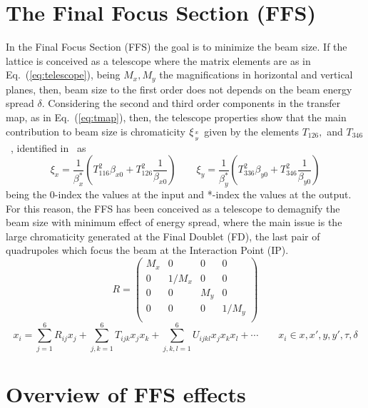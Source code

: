 \section{The Final Focus Section (FFS)}
In the Final Focus Section (FFS) the goal is to minimize the beam size. If the lattice is conceived as a telescope where the matrix elements are as in Eq.~(\ref{eq:telescope}), being $M_x, M_y$ the magnifications in horizontal and vertical planes, then, beam size to the first order does not depends on the beam energy spread $\delta$. Considering the second and third order components in the transfer map, as in Eq.~(\ref{eq:tmap}), then, the telescope properties show that the main contribution to beam size is chromaticity $\xi_{\genfrac{}{}{0pt}{}{x}{y}}$ given by the elements $T_{126},$ and $T_{346}$~\cite{Brown:1987}, identified in~\cite{GarciaMorales:1982827} as
\begin{equation}
 \xi_x = \frac{1}{\beta_x^*}\left(T_{116}^2\beta_{x0}+T_{126}^2\frac{1}{\beta_{x0}}\right)\qquad
 \xi_y = \frac{1}{\beta_y^*}\left(T_{336}^2\beta_{y0}+T_{346}^2\frac{1}{\beta_{y0}}\right)
\end{equation}
being the 0-index the values at the input and *-index the values at the output. For this reason, the FFS has been conceived as a telescope to demagnify the beam size with minimum effect of energy spread, where the main issue is the large chromaticity generated at the Final Doublet (FD), the last pair of quadrupoles which focus the beam at the Interaction Point (IP).
\begin{equation}
R=
 \begin{pmatrix}
   M_x & 0 & 0 & 0 \\
   0 & 1/M_x & 0 & 0 \\
   0 & 0 & M_y & 0 \\
   0 & 0 & 0 & 1/M_y \\
  \end{pmatrix}\label{eq:telescope}
\end{equation}
\begin{equation}
x_i=\sum_{j=1}^6R_{ij}x_j+\sum_{j,k=1}^6T_{ijk}x_jx_k+\sum_{j,k,l=1}^6U_{ijkl}x_jx_kx_l+\cdots\qquad x_i\in x,x',y,y',\tau,\delta\label{eq:tmap}
\end{equation}
\section{Overview of FFS effects}
